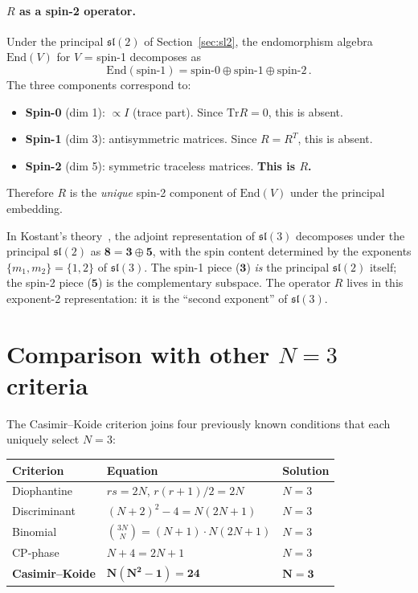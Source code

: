 \documentclass[final,3p,times,twocolumn]{elsarticle}
\newcommand{\Tr}{\mathrm{Tr}}
\begin{document}
\paragraph{$R$ as a spin-2 operator.}
Under the principal $\mathfrak{sl}(2)$ of
Section~\ref{sec:sl2}, the endomorphism algebra
$\mathrm{End}(V)$ for $V$ = spin-1 decomposes as
\begin{equation}
  \mathrm{End}(\text{spin-1})
  = \text{spin-0} \oplus \text{spin-1} \oplus \text{spin-2}\,.
\end{equation}
The three components correspond to:
\begin{itemize}
  \item \textbf{Spin-0} (dim 1): $\propto I$ (trace part).
    Since $\Tr R = 0$, this is absent.
  \item \textbf{Spin-1} (dim 3): antisymmetric matrices.
    Since $R = R^T$, this is absent.
  \item \textbf{Spin-2} (dim 5): symmetric traceless matrices.
    \textbf{This is $R$.}
\end{itemize}
Therefore $R$ is the \emph{unique} spin-2 component of
$\mathrm{End}(V)$ under the principal embedding.

In Kostant's theory~\cite{Kostant:1959}, the adjoint
representation of $\mathfrak{sl}(3)$ decomposes under the
principal $\mathfrak{sl}(2)$ as $\mathbf{8} = \mathbf{3}
\oplus \mathbf{5}$, with the spin content determined by the
exponents $\{m_1, m_2\} = \{1, 2\}$ of $\mathfrak{sl}(3)$.
The spin-1 piece ($\mathbf{3}$) \emph{is} the principal
$\mathfrak{sl}(2)$ itself; the spin-2 piece ($\mathbf{5}$) is
the complementary subspace.
The operator $R$ lives in this exponent-2 representation:
it is the ``second exponent'' of $\mathfrak{sl}(3)$.


\section{Comparison with other $N = 3$ criteria}
\label{sec:comparison}

The Casimir--Koide criterion joins four previously known
conditions that each uniquely select $N = 3$:

\begin{center}
\begin{tabular}{lll}
\toprule
Criterion & Equation & Solution \\
\midrule
Diophantine~\cite{Rivero:2024}
  & $rs = 2N$, $r(r{+}1)/2 = 2N$ & $N = 3$ \\
Discriminant
  & $(N{+}2)^2 - 4 = N(2N{+}1)$ & $N = 3$ \\
Binomial
  & $\binom{3N}{N} = (N{+}1) \cdot N(2N{+}1)$ & $N = 3$ \\
CP-phase
  & $N{+}4 = 2N{+}1$ & $N = 3$ \\
\textbf{Casimir--Koide}
  & $\mathbf{N(N^2{-}1) = 24}$ & $\mathbf{N = 3}$ \\
\bottomrule
\end{tabular}
\end{center}
\end{document}
